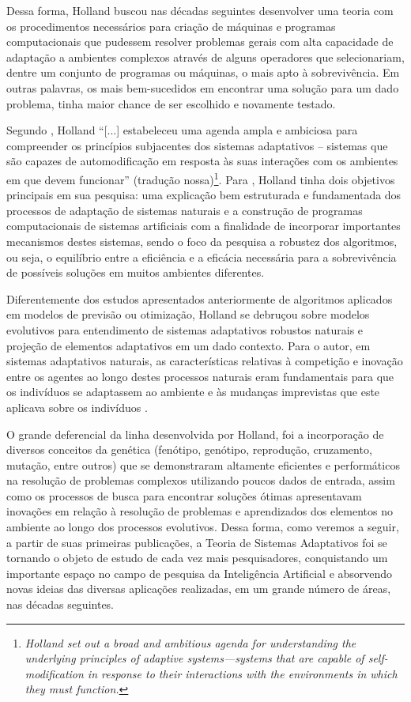 Dessa forma, Holland buscou nas décadas seguintes desenvolver uma teoria com os procedimentos necessários para criação de máquinas e programas computacionais que pudessem resolver problemas gerais com alta capacidade de adaptação a ambientes complexos através de alguns operadores que selecionariam, dentre um conjunto de programas ou máquinas, o mais apto à sobrevivência. Em outras palavras, os mais bem-sucedidos em encontrar uma solução para um dado problema, tinha maior chance de ser escolhido e novamente testado.

Segundo , Holland \enquote{[...] estabeleceu uma agenda ampla e ambiciosa para compreender os princípios subjacentes dos sistemas adaptativos – sistemas que são capazes de automodificação em resposta às suas interações com os ambientes em que devem funcionar} (tradução nossa)\footnote{\textit{Holland set out a broad and ambitious agenda for understanding the underlying principles of adaptive systems—systems that are capable of self-modification in response to their interactions with the environments in which they must function.}}. Para , Holland tinha dois objetivos principais em sua pesquisa: uma explicação bem estruturada e fundamentada dos processos de adaptação de sistemas naturais e a construção de programas computacionais de sistemas artificiais com a finalidade de incorporar importantes mecanismos destes sistemas, sendo o foco da pesquisa a robustez dos algoritmos, ou seja, o equilíbrio entre a eficiência e a eficácia necessária para a sobrevivência de possíveis soluções em muitos ambientes diferentes.

Diferentemente dos estudos apresentados anteriormente de algoritmos aplicados em modelos de previsão ou otimização, Holland se debruçou sobre modelos evolutivos para entendimento de sistemas adaptativos robustos naturais e projeção de elementos adaptativos em um dado contexto. Para o autor, em sistemas adaptativos naturais, as características relativas à competição e inovação entre os agentes ao longo destes processos naturais eram fundamentais para que os indivíduos se adaptassem ao ambiente e às mudanças imprevistas que este aplicava sobre os indivíduos .

O grande deferencial da linha desenvolvida por Holland, foi a incorporação de diversos conceitos da genética (fenótipo, genótipo, reprodução, cruzamento, mutação, entre outros) que se demonstraram altamente eficientes e performáticos na resolução de problemas complexos utilizando poucos dados de entrada, assim como os processos de busca para encontrar soluções ótimas apresentavam inovações em relação à resolução de problemas e aprendizados dos elementos no ambiente ao longo dos processos evolutivos. Dessa forma, como veremos a seguir, a partir de suas primeiras publicações, a Teoria de Sistemas Adaptativos foi se tornando o objeto de estudo de cada vez mais pesquisadores, conquistando um importante espaço no campo de pesquisa da Inteligência Artificial e absorvendo novas ideias das diversas aplicações realizadas, em um grande número de áreas, nas décadas seguintes.

